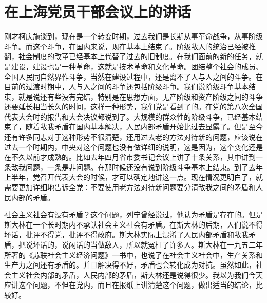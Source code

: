 \section[在上海党员干部会议上的讲话（一九五七年三月二十日）]{在上海党员干部会议上的讲话}


刚才柯庆施谈到，现在是一个转变时期，过去我们是长期从事革命战争，从事阶级斗争。而这个斗争，在国内来说，现在基本上结束了。阶级敌人的统治已经被推翻，社会制度的改革已经基本上代替了过去的旧制度。在我们面前的新的任务，就是建设，建设也是一种革命，这就是技术革命和文化革命。团结整个社会的成员、全国人民同自然界作斗争，当然在建设过程中，还是离不了人与人之间的斗争。在目前的过渡时期中，人与入之间的斗争还包括阶级斗争。我们说阶级斗争基本结束，就是说还有些没有完结，特别是在思想方面，无产阶级和资产阶级之间的斗争还要延长相当长久的时间，这样一种形势，我们党是看到了的。在党的第八次全国代表大会时的报告和大会决议都说到了。大规模的群众性的阶级斗争，已经基本结束了，随着敌我矛盾在国内基本解决，人民内部矛盾开始比过去显露了。但是至今还有许多同志对于这种形势不很清楚，还用过去老的方法对待新的问题，应该说在过去一个时期内，中央对这个问题也没有做详细的说明，这是因为，这个变化还是在不久以前才成熟的。比如去年四月省市委书记会议上讲了十条关系，其中讲到一条敌我问题，一条是非问题。在那时候还没有说到阶级斗争基本上结束。到了去年上半年，党召开代表大会的时候，才可以确定地讲这一点。现在情况更明白了，就需要更加详细地告诉全党：不要使用老方法对待新问题要分清敌我之间的矛盾和人民内部的矛盾。

社会主义社会有没有矛盾？这个问题，列宁曾经说过，他认为矛盾是存在的。但是斯大林在一个长时期内不承认社会主义社会有矛盾。在斯大林的后期，人们说不得坏话，批评不得党，批评不得政府。斯大林实际上混淆了人民内部矛盾和敌我矛盾，把说坏话的，说闲话的当做敌人，所以就冤枉了许多人。斯大林在一九五二年所著的《苏联社会主义经济问题》一书中，也说了在社会主义社会中，生产关系和生产力之间还有矛盾的。并且解决得不好，矛盾也会转化成为对抗。虽然如此，社会主义社会内部的矛盾，人民内部的矛盾，斯大林还是说得很少。我以为我们今天应讲这个问题，不但在党内，而且在报纸上讲清楚这个问题，做出适当的结论，比较好。

